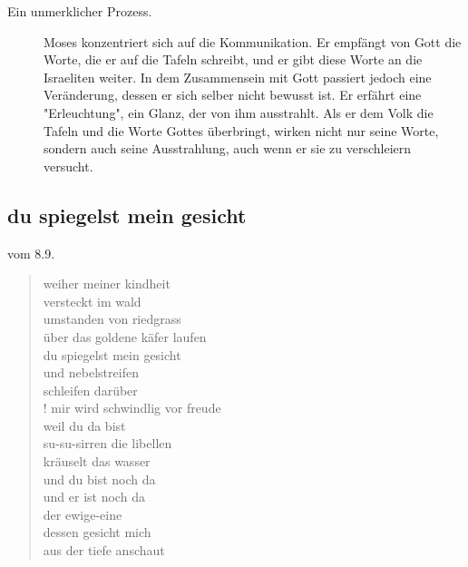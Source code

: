 \begin{impuls}
\begin{description}
\item[Ein unmerklicher Prozess.] Moses konzentriert sich auf die Kommunikation. Er empfängt von Gott die Worte, die er auf die Tafeln schreibt, und er gibt diese Worte an die Israeliten weiter. In dem Zusammensein mit Gott passiert jedoch eine Veränderung, dessen er sich selber nicht bewusst ist. Er erfährt eine "Erleuchtung", ein Glanz, der von ihm ausstrahlt. Als er dem Volk die Tafeln und die Worte Gottes überbringt, wirken nicht nur seine Worte, sondern auch seine Ausstrahlung, auch wenn er sie zu verschleiern versucht.
\end{description}

\begin{itemize}
\end{itemize}

\end{impuls}
\subsection{du spiegelst mein gesicht}
\cite{KHH} vom 8.9.
\begin{gedicht}
\begin{verse}
weiher meiner kindheit\\
versteckt im wald\\
umstanden von riedgrass\\
über das goldene käfer laufen\\
du spiegelst mein gesicht\\
und nebelstreifen\\
schleifen darüber\\!
mir wird schwindlig vor freude\\
weil du da bist\\
su-su-sirren die libellen\\
kräuselt das wasser\\
und du bist noch da\\
und er ist noch da\\
der ewige-eine\\
dessen gesicht mich\\
aus der tiefe anschaut
\end{verse}
\end{gedicht}
